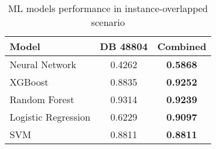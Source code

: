 \begin{table}[ht]
  \centering
  \caption{ML models performance in instance-overlapped scenario}
  \label{tab:vfl_ml_models_comparison}
  \begin{tabular}{lcc}
  \toprule
  \textbf{Model} & \textbf{DB 48804} & \textbf{Combined} \\
  \midrule
  Neural Network & 0.4262 & \textbf{0.5868} \\
  XGBoost & 0.8835 & \textbf{0.9252} \\
  Random Forest & 0.9314 & \textbf{0.9239} \\
  Logistic Regression & 0.6229 & \textbf{0.9097} \\
  SVM & 0.8811 & \textbf{0.8811} \\
  \bottomrule
  \end{tabular}
  \end{table}